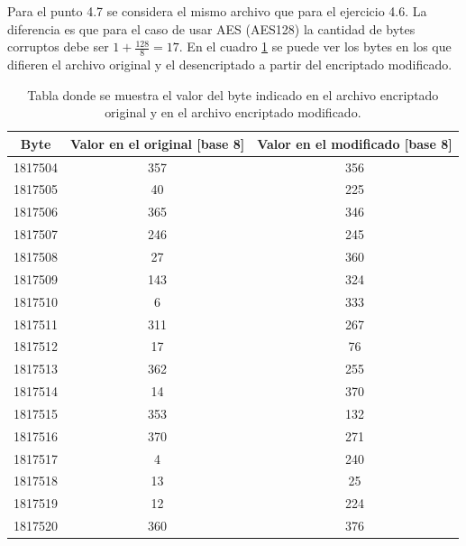 \documentclass[a4paper,10pt]{article}
\begin{document}
Para el punto 4.7 se considera el mismo archivo que para el ejercicio 4.6. La diferencia es que para el caso de usar
AES (AES128) la cantidad de bytes corruptos debe ser $ 1 + \frac{128}{8} = 17$. En el cuadro \ref{table47} se puede ver los bytes en los que difieren el archivo original y el desencriptado a partir
del encriptado modificado.
\begin{table}
\begin{center}
\begin{tabular}{|c|c|c|}
\hline
Byte & Valor en el original [base 8] & Valor en el modificado [base 8]\\
\hline
\hline
1817504 & 357 & 356 \\
1817505 & 40 & 225 \\
1817506 & 365 & 346 \\
1817507 & 246 & 245 \\
1817508 & 27 & 360 \\
1817509 & 143 & 324 \\
1817510 & 6 & 333 \\
1817511 & 311 & 267\\
1817512 & 17 & 76\\
1817513 & 362 & 255\\
1817514 & 14 & 370\\
1817515 & 353 & 132 \\
1817516 & 370 & 271\\
1817517 & 4 & 240\\
1817518 & 13 & 25\\
1817519 & 12 & 224\\
1817520 & 360 & 376\\
\hline
\end{tabular}
\end{center}
\caption{Tabla donde se muestra el valor del byte indicado en el archivo encriptado original y en el archivo encriptado modificado.}
\label{table47}
\end{table}
\end{document}

